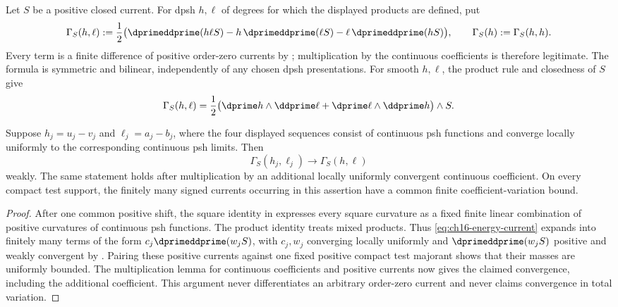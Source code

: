 Let $S$ be a positive closed current.  For dpsh $h,\ell$ of degrees for
which the displayed products are defined, put
\begin{equation}
\label{eq:ch16-energy-current}
 \Gamma_S(h,\ell)
 :=\frac12\bigl(
   \dprimeddprime(h\ell S)-h\,\dprimeddprime(\ell S)
        -\ell\,\dprimeddprime(hS)\bigr),
 \qquad \Gamma_S(h):=\Gamma_S(h,h).
\end{equation}
Every term is a finite difference of positive order-zero currents by
; multiplication by the
continuous coefficients is therefore legitimate.  The formula is symmetric
and bilinear, independently of any chosen dpsh presentations.  For smooth
$h,\ell$, the product rule and closedness of $S$ give
\begin{equation}
\label{eq:ch16-energy-smooth}
 \Gamma_S(h,\ell)
 =\frac12\bigl(\dprime h\wedge\ddprime\ell
              +\dprime\ell\wedge\ddprime h\bigr)\wedge S.
\end{equation}

\begin{lemma}
\label{lem:ch16-energy-continuity}
Suppose $h_j=u_j-v_j$ and $\ell_j=a_j-b_j$, where the four displayed
sequences consist of continuous psh functions and converge locally uniformly
to the corresponding continuous psh limits.  Then
\[
                  \Gamma_S(h_j,\ell_j)\longrightarrow
                  \Gamma_S(h,\ell)
\]
weakly.  The same statement holds after multiplication by an additional
locally uniformly convergent continuous coefficient.  On every compact test
support, the finitely many signed currents occurring in this assertion have
a common finite coefficient-variation bound.
\end{lemma}

\begin{proof}
After one common positive shift, the square identity in
 expresses every square curvature as a fixed
finite linear combination of positive curvatures of continuous psh
functions.  The product identity treats mixed products.  Thus
\eqref{eq:ch16-energy-current} expands into finitely many terms of the form
$c_j\dprimeddprime(w_jS)$, with $c_j,w_j$ converging locally uniformly and
$\dprimeddprime(w_jS)$ positive and weakly convergent by
.  Pairing these positive currents against one
fixed positive compact test majorant shows that their masses are uniformly
bounded.  The multiplication lemma for continuous coefficients and positive
currents now gives the claimed convergence, including the additional
coefficient.  This argument never differentiates an arbitrary order-zero
current and never claims convergence in total variation.
\end{proof}

